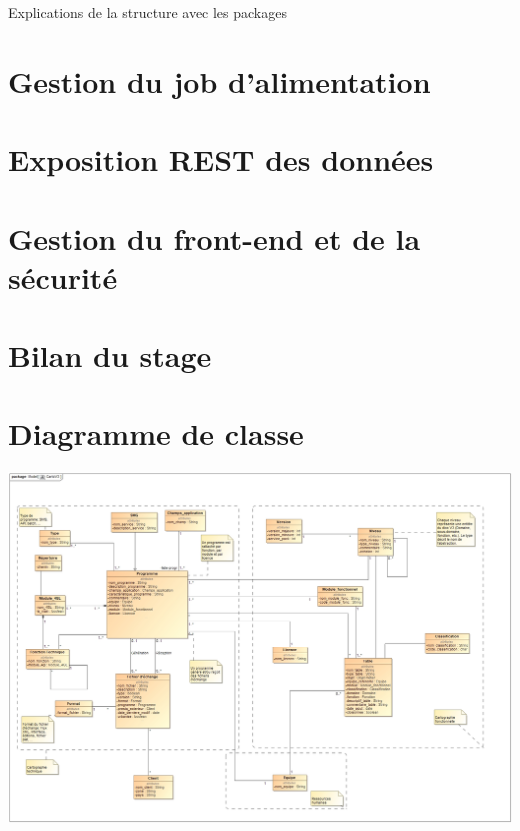 \documentclass{polytech/polytech}
\begin{document}
Explications de la structure avec les packages

\chapter{Gestion du job d'alimentation}


\chapter{Exposition REST des données}


\chapter{Gestion du front-end et de la sécurité}


\chapter*{Bilan du stage}


\appendix

\chapter{Diagramme de classe}
\label{ann:diagClasse}

\begin{landscape}
	\includegraphics[scale=0.4]{images/CartoV3}
\end{landscape}
\end{document}
